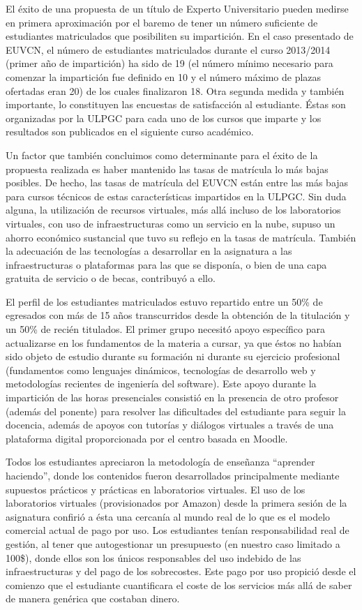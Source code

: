 \documentclass[conference]{IEEEtran}
\begin{document}
El éxito de una propuesta de un título de Experto Universitario pueden medirse
en primera aproximación por el baremo de tener un número suficiente de
estudiantes matriculados que posibiliten su impartición. En el caso presentado
de EUVCN, el número de estudiantes matriculados durante el curso 2013/2014
(primer año de impartición) ha sido  de 19 (el número mínimo necesario para
comenzar la impartición fue definido en
10 y  el número máximo de plazas ofertadas eran 20) de los cuales finalizaron
18. Otra
segunda medida y también importante, lo constituyen las encuestas de
satisfacción al estudiante. Éstas son organizadas por la ULPGC para cada uno de los cursos que imparte y los resultados son publicados en el siguiente curso académico.

Un factor que también concluimos como determinante para el éxito de la
propuesta realizada es haber mantenido las tasas de matrícula lo más bajas
posibles. De hecho, las tasas de matrícula del EUVCN están entre las más bajas
para cursos técnicos de estas características impartidos en la ULPGC. Sin duda
alguna, la utilización de recursos virtuales, más allá incluso de los
laboratorios virtuales, con uso de infraestructuras como un servicio en la
nube, supuso un ahorro económico sustancial que tuvo su reflejo en la tasas de
matrícula. También la adecuación de las tecnologías a desarrollar en la asignatura a
las infraestructuras o plataformas para las que se disponía, o bien de una
capa gratuita de servicio o de becas, contribuyó a ello.

El perfil de los estudiantes matriculados estuvo repartido entre un
50\% de egresados con más de 15 años transcurridos desde la obtención de la
titulación y un 50\% de recién titulados.
El primer grupo necesitó apoyo específico para actualizarse en los fundamentos
de la materia a cursar, ya que éstos no habían sido objeto de estudio durante su
formación ni durante su ejercicio profesional (fundamentos como lenguajes
dinámicos, tecnologías de desarrollo web y metodologías recientes de ingeniería
del software). Este apoyo durante la impartición de las horas presenciales
consistió en la presencia de otro profesor (además del ponente) para resolver
las dificultades del estudiante para seguir la docencia, además de apoyos con
tutorías y diálogos virtuales a través de una plataforma digital proporcionada
por el centro basada en Moodle.

Todos los estudiantes apreciaron la metodología de enseñanza ``aprender
haciendo'', donde los contenidos fueron desarrollados principalmente mediante
supuestos prácticos y prácticas en laboratorios virtuales. El uso de los
laboratorios virtuales (provisionados por Amazon) desde la primera sesión de la
asignatura confirió a ésta una cercanía al mundo real de lo que es el modelo comercial actual de pago por
uso. Los estudiantes tenían responsabilidad real de
gestión,  al tener que  autogestionar un presupuesto (en nuestro caso limitado a
100\$), donde ellos son los únicos responsables del uso indebido de las
infraestructuras y del pago de los sobrecostes. Este pago por uso propició desde
el comienzo que el estudiante cuantificara el coste de los servicios más allá
de saber de manera genérica que costaban dinero. 
\end{document}
